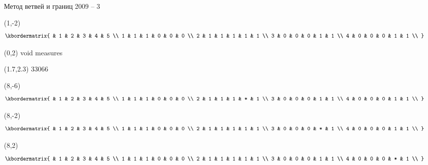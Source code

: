 \documentclass[10pt, dvipsnames]{beamer}
\begin{document}
\begin{frame}{Метод ветвей и границ 2009 -- 3}	
	\begin{textblock}{1}(1,-2) 
\[
\small
  \kbordermatrix{
      & 1 & 2 & 3 & 4 & 5 \\
    1 & 1 & 1 & 0 & 0 & 0 \\
    2 & 1 & 1 & 1 & 1 & 1 \\
    3 & 0 & 0 & 0 & 1 & 1 \\
    4 & 0 & 0 & 0 & 1 & 1 \\
  }
\]
	\end{textblock}

	\begin{textblock}{1}(0,2)
\small void measures
	\end{textblock}

	\begin{textblock}{1}(1.7,2.3)
\mbox{\small\hspace{7pt}3\hspace{10pt}3\hspace{10pt}0\hspace{10pt}6\hspace{10pt}6}
	\end{textblock}

	\begin{textblock}{1}(8,-6)
\[
\small
  \kbordermatrix{
      & 1 & 2 & 3 & 4 & 5 \\
    1 & 1 & 1 & 0 & 0 & 0 \\
    2 & 1 & 1 & 1 & * & 1 \\
    3 & 0 & 0 & 0 & 1 & 1 \\
    4 & 0 & 0 & 0 & 1 & 1 \\
  }
\]
	\end{textblock}

	\begin{textblock}{1}(8,-2)
\[
\small
  \kbordermatrix{
      & 1 & 2 & 3 & 4 & 5 \\
    1 & 1 & 1 & 0 & 0 & 0 \\
    2 & 1 & 1 & 1 & 1 & 1 \\
    3 & 0 & 0 & 0 & * & 1 \\
    4 & 0 & 0 & 0 & 1 & 1 \\
  }
\]
	\end{textblock}

	\begin{textblock}{1}(8,2)
\[
\small
  \kbordermatrix{
      & 1 & 2 & 3 & 4 & 5 \\
    1 & 1 & 1 & 0 & 0 & 0 \\
    2 & 1 & 1 & 1 & 1 & 1 \\
    3 & 0 & 0 & 0 & 1 & 1 \\
    4 & 0 & 0 & 0 & * & 1 \\
  }
\]
	\end{textblock}
	

\end{frame}
\end{document}
